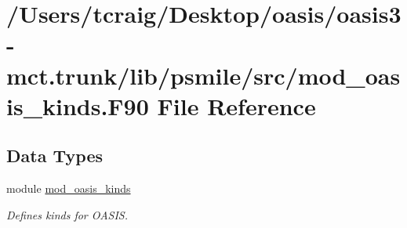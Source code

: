 \hypertarget{mod__oasis__kinds_8_f90}{\section{/\+Users/tcraig/\+Desktop/oasis/oasis3-\/mct.trunk/lib/psmile/src/mod\+\_\+oasis\+\_\+kinds.F90 File Reference}
\label{mod__oasis__kinds_8_f90}
}
\subsection*{Data Types}
\begin{DoxyCompactItemize}
\item 
module \hyperlink{classmod__oasis__kinds}{mod\+\_\+oasis\+\_\+kinds}
\begin{DoxyCompactList}\small\item\em Defines kinds for O\+A\+S\+I\+S. \end{DoxyCompactList}\end{DoxyCompactItemize}
